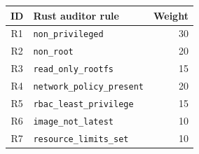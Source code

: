 \begin{tabular}{|c|p{}|r|}
\hline
\textbf{ID} & \textbf{Rust auditor rule} & \textbf{Weight} \\
\hline
R1 & \texttt{non\_privileged} & 30 \\
\hline
R2 & \texttt{non\_root} & 20 \\
\hline
R3 & \texttt{read\_only\_rootfs} & 15 \\
\hline
R4 & \texttt{network\_policy\_present} & 20 \\
\hline
R5 & \texttt{rbac\_least\_privilege} & 15 \\
\hline
R6 & \texttt{image\_not\_latest} & 10 \\
\hline
R7 & \texttt{resource\_limits\_set} & 10 \\
\hline
\end{tabular}
